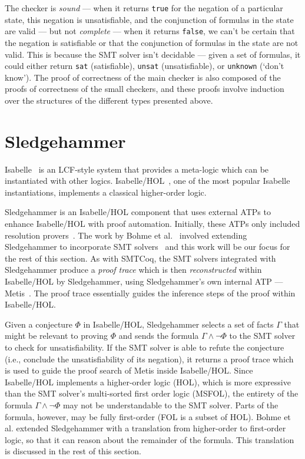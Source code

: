 \documentclass{article}
\begin{document}
	The checker is \textit{sound} ---
	when it returns \texttt{true} for 
	the negation of a particular state, 
	this negation is unsatisfiable, and
	the conjunction of formulas in the 
	state are valid --- but 
	not \textit{complete} --- when it 
	returns \texttt{false}, we can't be 
	certain that the negation is 
	satisfiable or that the conjunction 
	of formulas in the state are not 
	valid. This is because the SMT 
	solver isn't 
	decidable --- given a set of 
	formulas, it could either 
	return \texttt{sat} (satisfiable), 
	\texttt{unsat} (unsatisfiable), or 
	\texttt{unknown} (`don't know').
	The proof of correctness of the main 
	checker is also composed of the 
	proofs of correctness of the small 
	checkers, and these proofs involve 
	induction over the structures of 
	the different types presented 
	above. 

	
\section{Sledgehammer}
\label{sec:hammer}
	Isabelle~\cite{DBLP:journals/corr/cs-LO-9301106} 
	is an LCF-style system that 
	provides a meta-logic which can be 
	instantiated with other logics.
	Isabelle/HOL~\cite{10.5555/1791547}, 
	one of the most popular Isabelle 
	instantiations, implements a 
	classical higher-order logic. 
	
	Sledgehammer is
	an Isabelle/HOL component that 
	uses external ATPs to enhance 
	Isabelle/HOL with proof 
	automation. Initially, these 
	ATPs only included resolution 
	provers~\cite{10.1007/978-3-642-39799-8_1}.
	The work by Bohme et 
	al.~\cite{bohme} involved 
	extending Sledgehammer to 
	incorporate SMT
	solvers~\cite{Barrett2018} and this 
	work will be our focus for the 
	rest of this section. As with 
	SMTCoq, the SMT solvers integrated
	with Sledgehammer produce a 
	\textit{proof trace} which is 
	then \textit{reconstructed} within
	Isabelle/HOL by Sledgehammer, 
	using Sledgehammer's own internal 
	ATP --- Metis~\cite{hurd2003d}. The 
	proof trace essentially guides 
	the inference steps of the proof 
	within Isabelle/HOL.
	
	Given a conjecture $\Phi$ in 
	Isabelle/HOL, Sledgehammer 
	selects a set of facts 
	$\Gamma$ that might be relevant 
	to proving $\Phi$ and sends
	the formula $\Gamma \land \neg 
	\Phi$ to the SMT solver to check 
	for unsatisfiability. If the SMT 
	solver is able to refute the 
	conjecture (i.e., conclude 
	the unsatisfiability of its 
	negation), it returns 
	a proof trace which is 
	used to guide the proof search 
	of Metis inside Isabelle/HOL.
	Since Isabelle/HOL implements 
	a higher-order logic (HOL), which 
	is more expressive than 
	the SMT solver's multi-sorted
	first order logic (MSFOL),
	the entirety of the formula
	$\Gamma \land \neg \Phi$ may not 
	be understandable to the SMT 
	solver. Parts of the formula,
	however, may be fully 
	first-order (FOL is 
	a subset of HOL). Bohme et al.
	extended Sledgehammer with 
	a translation from higher-order 
	to first-order logic, so that 
	it can reason about the remainder
	of the formula. This translation
	is discussed in the rest of this 
	section.
	
\end{document}
